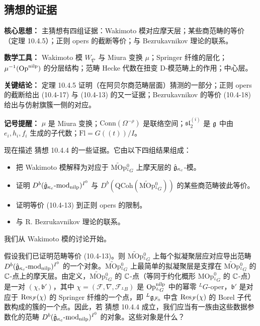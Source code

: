 \subsection{猜想的证据}

\begin{keypoints}
    \item \textbf{核心思想：} 主猜想有四组证据：Wakimoto 模对应摩天层；某些商范畴的等价（定理 10.4.5）；正则 opers 的截断等价；与 Bezrukavnikov 理论的联系。
    \item \textbf{数学工具：} Wakimoto 模 $W_{\overline{\nabla}}$ 与 Miura 变换 $\mu$；Springer 纤维的层化；$\mu^{-1}(\operatorname{Op}^{\mathrm{nilp}})$ 的分层结构；范畴 Hecke 代数在扭变 D-模范畴上的作用；中心层。
    \item \textbf{关键结论：} 定理 10.4.5 证明（在阿贝尔商范畴层面）猜测的一部分；正则 opers 的截断给出 (10.4-17) 与 (10.4-13) 的又一证据；Bezrukavnikov 的等价 (10.4-18) 给出与仿射旗簇一侧的对应。
    \item \textbf{记号提醒：} $\mu$ 是 Miura 变换；$\mathrm{Conn}(\Omega^{-\rho})$ 是联络空间；$\mathfrak{sl}_2^{(i)}$ 是 $\mathfrak{g}$ 中由 $e_i,h_i,f_i$ 生成的子代数；$\mathrm{Fl}=G((t))/I$。
\end{keypoints}

现在描述 猜想 10.4.4 的一些证据。它由以下四组结果组成：
\begin{itemize}
    \item 把 Wakimoto 模解释为对应于 $\widetilde{\mathrm{MOp}}{}^0_{{}^L G}$ 上摩天层的 $\hat{\mathfrak{g}}_{\kappa_c}$-模。
    \item 证明 $D^b(\hat{\mathfrak{g}}_{\kappa_c}\text{-}\mathrm{mod}_{\mathrm{nilp}})^{I^0}$ 与 $D^b(\mathrm{QCoh}(\widetilde{\mathrm{MOp}}{}^0_{{}^L G}))$ 的某些商范畴彼此等价。
    \item 证明等价 (10.4-13) 到正则 opers 的限制。
    \item 与 R. Bezrukavnikov 理论的联系。
\end{itemize}
我们从 Wakimoto 模的讨论开始。

假设我们已证明范畴等价 (10.4-13)。则 $\widetilde{\mathrm{MOp}}{}^0_{{}^L G}$ 上每个拟凝聚层应对应导出范畴 $D^b(\hat{\mathfrak{g}}_{\kappa_c}\text{-}\mathrm{mod}_{\mathrm{nilp}})^{I^0}$ 的一个对象。$\widetilde{\mathrm{MOp}}{}^0_{{}^L G}$ 上最简单的拟凝聚层是支撑在 $\widetilde{\mathrm{MOp}}{}^0_{{}^L G}$ 的 $\mathbb{C}$-点上的摩天层。由定义，$\widetilde{\mathrm{MOp}}{}^0_{{}^L G}$ 的 $\mathbb{C}$-点（等同于约化概形 $\mathrm{MOp}^0_{{}^L G}$ 的 $\mathbb{C}$-点）是一对 $(\chi,\mathfrak{b}')$，其中 $\chi=(\mathcal{F},\nabla,\mathcal{F}_{{}^L B})$ 是 $\operatorname{Op}^{\mathrm{nilp}}_{{}^L G}$ 中的幂零 ${}^L G$-oper，$\mathfrak{b}'$ 是对应于 $\operatorname{Res}_{\mathcal{F}}(\chi)$ 的 Springer 纤维的一个点，即 ${}^L\mathfrak{g}_{\mathcal{F}_0}$ 中含 $\operatorname{Res}_{\mathcal{F}}(\chi)$ 的 Borel 子代数构成的簇的一个点。因此，若 猜想 10.4.4 成立，我们应当有一族由这些数据参数化的范畴 $D^b(\hat{\mathfrak{g}}_{\kappa_c}\text{-}\mathrm{mod}_{\mathrm{nilp}})^{I^0}$ 的对象。这些对象是什么？

